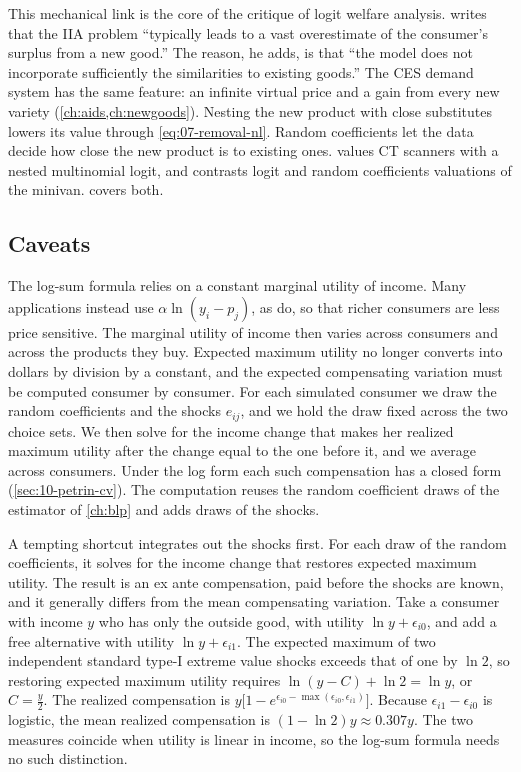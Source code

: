This mechanical link is the core of the critique of logit welfare analysis. \citet[p.~230]{Hausman1997} writes that the
IIA problem ``typically leads to a vast overestimate of the consumer's surplus from a new good.'' The reason, he adds,
is that ``the model does not incorporate sufficiently the similarities to existing goods.'' The CES demand system has the same feature: an
infinite virtual price and a gain from every new variety (\cref{ch:aids,ch:newgoods}). Nesting the new product with
close substitutes lowers its value through \eqref{eq:07-removal-nl}. Random coefficients let the data decide how
close the new product is to existing ones.  values CT scanners with a nested multinomial
logit, and \citet{Petrin2002} contrasts logit and random coefficients valuations of the minivan. 
covers both.

\subsection{Caveats}\label{sec:07-welfare-caveats}

The log-sum formula relies on a constant marginal utility of income. Many applications instead use
$\alpha\ln(y_i - p_j)$, as \citet{BerryLevinsohnPakes1995} do, so that richer consumers are less price sensitive.
The marginal utility of income then varies across consumers and across the products they buy. Expected maximum
utility no longer converts into dollars by division by a constant, and the expected compensating variation must be
computed consumer by consumer. For each simulated consumer we draw the random coefficients and the shocks $e_{ij}$,
and we hold the draw fixed across the two choice sets. We then solve for the income change that makes her realized
maximum utility after the change equal to the one before it, and we average across consumers. Under the log form
each such compensation has a closed form (\cref{sec:10-petrin-cv}). The computation reuses the random coefficient
draws of the estimator of \cref{ch:blp} and adds draws of the shocks.

A tempting shortcut integrates out the shocks first. For each draw of the random coefficients, it solves for the
income change that restores expected maximum utility. The result is an ex ante compensation, paid before the shocks
are known, and it generally differs from the mean compensating variation. Take a consumer with income $y$ who has
only the outside good, with utility $\ln y + \epsilon_{i0}$, and add a free alternative with utility $\ln y +
\epsilon_{i1}$. The expected maximum of two independent standard type-I extreme value shocks exceeds that of one by
$\ln 2$, so restoring expected maximum utility requires $\ln(y - C) + \ln 2 = \ln y$, or $C = \frac{y}{2}$. The
realized compensation is $y\big[1 - e^{\epsilon_{i0} - \max(\epsilon_{i0}, \epsilon_{i1})}\big]$. Because
$\epsilon_{i1} - \epsilon_{i0}$ is logistic, the mean realized compensation is $(1 - \ln 2)y \approx 0.307y$. The two measures coincide when
utility is linear in income, so the log-sum formula needs no such distinction.

